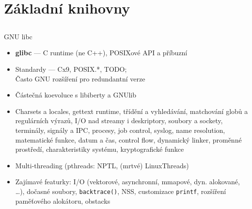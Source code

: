 \documentclass{beamer}
\begin{document}
\section{Základní knihovny}

\subsection{}
\begin{frame}{GNU libc}
\begin{itemize}
\item {\bf glibc} --- C runtime (ne C++), POSIXové API a příbuzní
\item Standardy --- Cx9, POSIX.*, TODO; \\ Často GNU rozšíření pro redundantní verze
\item Částečná koevoluce s libiberty a GNUlib
\item Charsets a locales, gettext runtime, třídění a vyhledávání, matchování globů a regulárních výrazů, I/O nad streamy i deskriptory, soubory a sockety, terminály, signály a IPC, procesy, job control, syslog, name resolution, matematické funkce, datum a čas, control flow, dynamický linker, proměnné prostředí, charakteristiky systému, kryptografické funkce
\item Multi-threading (pthreads: NPTL, (mrtvé) LinuxThreads)
\item Zajímavé featurky: I/O (vektorové, asynchronní, mmapové, dyn. alokované, \dots), dočasné soubory, {\tt backtrace()}, NSS, customizace {\tt printf}, rozšíření paměťového alokátoru, obstacks
\end{itemize}
\end{frame}

\subsection{}
\end{document}
